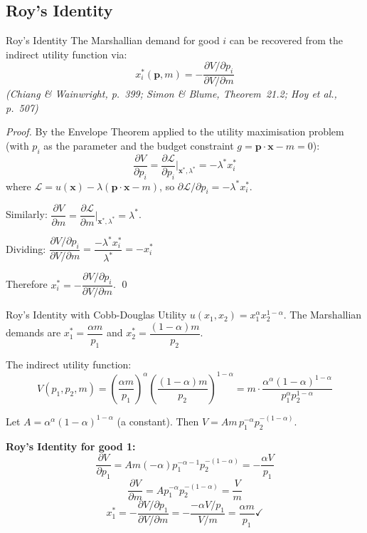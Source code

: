\documentclass[12pt, a4paper]{article}
\theoremstyle{definition}
\newcommand{\bx}{\mathbf{x}}
\newcommand{\bp}{\mathbf{p}}
\newcommand{\pp}[2]{\dfrac{\partial #1}{\partial #2}}
\newcommand{\Lag}{\mathcal{L}}
\begin{document}
\subsection{Roy's Identity}

\begin{thmbox}{Roy's Identity}
The Marshallian demand for good $i$ can be recovered from the indirect
utility function via:
\[
  x_i^*(\bp,m) = -\dfrac{\partial V/\partial p_i}{\partial V/\partial m}
\]
\emph{(Chiang \& Wainwright, p.\ 399; Simon \& Blume, Theorem~21.2;
Hoy et al., p.\ 507)}
\end{thmbox}

\begin{proof}
By the Envelope Theorem applied to the utility maximisation problem (with $p_i$ as the parameter and the budget constraint $g = \bp\cdot\bx - m = 0$):
\[
  \pp{V}{p_i}
  = \pp{\Lag}{p_i}\bigg|_{\bx^*,\lambda^*}
  = -\lambda^* x_i^*
\]
where $\Lag = u(\bx) - \lambda(\bp\cdot\bx - m)$, so $\partial\Lag/\partial p_i = -\lambda^* x_i^*$.

Similarly:
$\pp{V}{m} = \pp{\Lag}{m}\big|_{\bx^*,\lambda^*} = \lambda^*$.

Dividing:
$\dfrac{\partial V/\partial p_i}{\partial V/\partial m}
= \dfrac{-\lambda^* x_i^*}{\lambda^*} = -x_i^*$

Therefore $x_i^* = -\dfrac{\partial V/\partial p_i}{\partial V/\partial m}$. \qed
\end{proof}

\begin{exbox}{Roy's Identity with Cobb-Douglas Utility}
$u(x_1,x_2) = x_1^\alpha x_2^{1-\alpha}$. The Marshallian demands are
$x_1^* = \dfrac{\alpha m}{p_1}$ and $x_2^* = \dfrac{(1-\alpha)m}{p_2}$.

The indirect utility function:
\[
  V(p_1,p_2,m)
  = \left(\frac{\alpha m}{p_1}\right)^\alpha
    \left(\frac{(1-\alpha)m}{p_2}\right)^{1-\alpha}
  = m\cdot\frac{\alpha^\alpha(1-\alpha)^{1-\alpha}}{p_1^\alpha p_2^{1-\alpha}}
\]

Let $A = \alpha^\alpha(1-\alpha)^{1-\alpha}$ (a constant). Then
$V = Am\,p_1^{-\alpha}p_2^{-(1-\alpha)}$.

\textbf{Roy's Identity for good 1:}
\[
  \pp{V}{p_1} = Am(-\alpha)p_1^{-\alpha-1}p_2^{-(1-\alpha)}
  = -\frac{\alpha V}{p_1}
\]
\[
  \pp{V}{m} = Ap_1^{-\alpha}p_2^{-(1-\alpha)} = \frac{V}{m}
\]
\[
  x_1^* = -\frac{\partial V/\partial p_1}{\partial V/\partial m}
         = -\frac{-\alpha V/p_1}{V/m}
         = \frac{\alpha m}{p_1} \checkmark
\]
\end{exbox}
\end{document}
